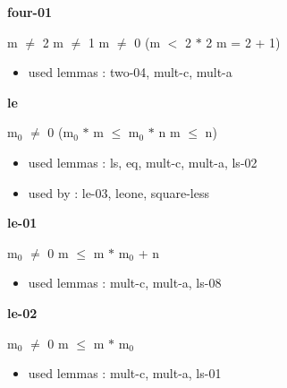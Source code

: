 \documentclass[a4paper]{article}
\begin{document}
\medskip

\bigskip

{\large\bf four-01}

\medskip

 \Fol m $\neq$ 2 \And m $\neq$ 1 \And m $\neq$ 0 \Imp (m $<$ 2 $*$ 2 \Equiv m = 2 + 1)

\begin{itemize}


\item       used lemmas  : two-04, mult-c, mult-a

\end{itemize}

\medskip

\bigskip

{\large\bf le}

\medskip

 \Fol $\mbox{m}_{0}$ $\neq$ 0 \Imp ($\mbox{m}_{0}$ $*$ m $\le$ $\mbox{m}_{0}$ $*$ n \Equiv m $\le$ n)

\begin{itemize}


\item       used lemmas  : ls, eq, mult-c, mult-a, ls-02
\item       used by      : le-03, leone, square-less

\end{itemize}

\medskip

\bigskip

{\large\bf le-01}

\medskip

 \Fol $\mbox{m}_{0}$ $\neq$ 0 \Imp m $\le$ m $*$ $\mbox{m}_{0}$ + n

\begin{itemize}


\item       used lemmas  : mult-c, mult-a, ls-08

\end{itemize}

\medskip

\bigskip

{\large\bf le-02}

\medskip

 \Fol $\mbox{m}_{0}$ $\neq$ 0 \Imp m $\le$ m $*$ $\mbox{m}_{0}$

\begin{itemize}


\item       used lemmas  : mult-c, mult-a, ls-01

\end{itemize}
\end{document}
